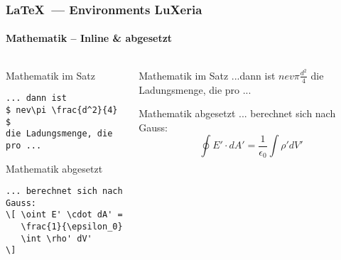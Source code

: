 \begin{frame}[fragile]
    \frametitle{\LaTeX~--- Environments \hfill{} \footnotesize{LuXeria}}
    \framesubtitle{Mathematik -- Inline \& abgesetzt}
    \begin{columns}
        \begin{column}{5cm}
            \begin{block}{Mathematik im Satz}
\begin{lstlisting}
... dann ist
$ nev\pi \frac{d^2}{4} $ 
die Ladungsmenge, die pro ...
\end{lstlisting}
            \end{block}
            \begin{block}{Mathematik abgesetzt}
\begin{lstlisting}
... berechnet sich nach Gauss: 
\[ \oint E' \cdot dA' = 
   \frac{1}{\epsilon_0} 
   \int \rho' dV' 
\]
\end{lstlisting}
            \end{block}
        \end{column}
        \begin{column}{5cm}
            \begin{block}{Mathematik im Satz}
            ...dann ist $nev\pi \frac{d^2}{4}$ die Ladungsmenge,
            die pro ...%
            \end{block}
            \begin{block}{Mathematik abgesetzt}
            ... berechnet sich nach Gauss:
            \[ \oint E' \cdot dA' = \frac{1}{\epsilon_0} \int \rho' dV' \]
            \end{block}
        \end{column}
    \end{columns}
\end{frame}


